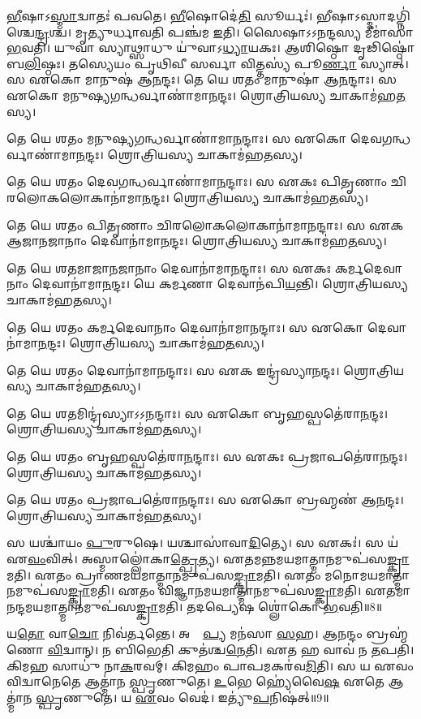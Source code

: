 \ul{𑌭𑍀}𑌷𑌾𑌽\ul{𑌸𑍍𑌮𑌾}𑌦𑍍𑌵𑌾𑌤𑌃॑ 𑌪𑌵𑌤𑍇। 
\ul{𑌭𑍀}𑌷𑍋𑌦𑍇॑\ul{𑌤𑌿} 𑌸𑍂𑌰𑍍𑌯𑌃॑। 
𑌭𑍀𑌷𑌾𑌽𑌸𑍍𑌮𑌾𑌦𑌗𑍍𑌨𑌿॑\-𑌶𑍍𑌚𑍇\ul{𑌨𑍍𑌦𑍍𑌰}𑌶𑍍𑌚। 
𑌮𑍃𑌤𑍍𑌯𑍁𑌰𑍍𑌧𑌾𑌵𑌤𑌿 𑌪𑌞𑍍𑌚॑𑌮 \ul{𑌇}𑌤𑌿। 
𑌸𑍈𑌷𑌾𑌽𑌽𑌨𑌨𑍍𑌦𑌸𑍍𑌯 𑌮𑍀𑌮𑌾॑𑌸𑌾 \ul{𑌭}𑌵𑌤𑌿। 
𑌯𑍁𑌵𑌾 𑌸𑍍𑌯𑌾𑌥𑍍𑌸𑌾𑌧𑍁 𑌯𑍁॑𑌵𑌾𑌽\ul{𑌧𑍍𑌯𑌾}𑌯𑌕𑌃। 
𑌆𑌶𑌿𑌷𑍍𑌠𑍋 𑌦𑍃𑌢𑌿𑌷𑍍𑌠𑍋॑ 𑌬\ul{𑌲𑌿}𑌷𑍍𑌠𑌃। 
𑌤𑌸𑍍𑌯𑍇𑌯𑌂 𑌪𑍃𑌥𑌿𑌵𑍀 𑌸𑌰𑍍𑌵𑌾 𑌵𑌿𑌤𑍍𑌤𑌸𑍍𑌯॑ 𑌪𑍂\ul{𑌰𑍍𑌣𑌾} 𑌸𑍍𑌯𑌾𑌤𑍍। 
𑌸 𑌏𑌕𑍋 𑌮𑌾𑌨𑍁𑌷॑ 𑌆\ul{𑌨}𑌨𑍍𑌦𑌃। 
𑌤𑍇 𑌯𑍇 𑌶𑌤𑌂 𑌮𑌾𑌨𑍁𑌷𑌾॑ 𑌆\ul{𑌨}𑌨𑍍𑌦𑌾𑌃। 
𑌸 𑌏𑌕𑍋 𑌮𑌨𑍁𑌷𑍍𑌯𑌗𑌨𑍍𑌧𑌰𑍍𑌵𑌾𑌣𑌾॑𑌮𑌾\ul{𑌨}𑌨𑍍𑌦𑌃। 
𑌶𑍍𑌰𑍋𑌤𑍍𑌰𑌿𑌯𑌸𑍍𑌯 𑌚𑌾𑌕𑌾𑌮॑𑌹\ul{𑌤}𑌸𑍍𑌯। 

𑌤𑍇 𑌯𑍇 𑌶𑌤𑌂 𑌮𑌨𑍁𑌷𑍍𑌯𑌗𑌨𑍍𑌧𑌰𑍍𑌵𑌾𑌣𑌾॑𑌮𑌾\ul{𑌨}𑌨𑍍𑌦𑌾𑌃। 
𑌸 𑌏𑌕𑍋 𑌦𑍇𑌵𑌗𑌨𑍍𑌧𑌰𑍍𑌵𑌾𑌣𑌾॑𑌮𑌾\ul{𑌨}𑌨𑍍𑌦𑌃। 
𑌶𑍍𑌰𑍋𑌤𑍍𑌰𑌿𑌯𑌸𑍍𑌯 𑌚𑌾𑌕𑌾𑌮॑𑌹\ul{𑌤}𑌸𑍍𑌯। 

𑌤𑍇 𑌯𑍇 𑌶𑌤𑌂 𑌦𑍇𑌵𑌗𑌨𑍍𑌧𑌰𑍍𑌵𑌾𑌣𑌾॑𑌮𑌾\ul{𑌨}𑌨𑍍𑌦𑌾𑌃। 
𑌸 𑌏𑌕𑌃 𑌪𑌿𑌤𑍃𑌣𑌾𑌂 𑌚𑌿𑌰𑌲𑍋𑌕𑌲𑍋𑌕𑌾𑌨𑌾॑𑌮𑌾\ul{𑌨}𑌨𑍍𑌦𑌃। 
𑌶𑍍𑌰𑍋𑌤𑍍𑌰𑌿𑌯𑌸𑍍𑌯 𑌚𑌾𑌕𑌾𑌮॑𑌹\ul{𑌤}𑌸𑍍𑌯। 

𑌤𑍇 𑌯𑍇 𑌶𑌤𑌂 𑌪𑌿𑌤𑍃𑌣𑌾𑌂 𑌚𑌿𑌰𑌲𑍋𑌕𑌲𑍋𑌕𑌾𑌨𑌾॑\-𑌮𑌾\ul{𑌨}𑌨𑍍𑌦𑌾𑌃। 
𑌸 𑌏𑌕 𑌆𑌜𑌾𑌨𑌜𑌾𑌨𑌾𑌂 𑌦𑍇𑌵𑌾𑌨𑌾॑𑌮𑌾\ul{𑌨}𑌨𑍍𑌦𑌃। 
𑌶𑍍𑌰𑍋𑌤𑍍𑌰𑌿𑌯𑌸𑍍𑌯 𑌚𑌾𑌕𑌾𑌮॑𑌹\ul{𑌤}𑌸𑍍𑌯। 

𑌤𑍇 𑌯𑍇 𑌶𑌤𑌮𑌾𑌜𑌾𑌨𑌜𑌾𑌨𑌾𑌂 𑌦𑍇𑌵𑌾𑌨𑌾॑𑌮𑌾\ul{𑌨}𑌨𑍍𑌦𑌾𑌃। 
𑌸 𑌏𑌕𑌃 𑌕𑌰𑍍𑌮𑌦𑍇𑌵𑌾𑌨𑌾𑌂 𑌦𑍇𑌵𑌾𑌨𑌾॑𑌮𑌾\ul{𑌨}𑌨𑍍𑌦𑌃। 
𑌯𑍇 𑌕𑌰𑍍𑌮𑌣𑌾 𑌦𑍇𑌵𑌾𑌨॑𑌪𑌿\ul{𑌯}𑌨𑍍𑌤𑌿। 
𑌶𑍍𑌰𑍋𑌤𑍍𑌰𑌿𑌯𑌸𑍍𑌯 𑌚𑌾𑌕𑌾𑌮॑𑌹\ul{𑌤}𑌸𑍍𑌯। 

𑌤𑍇 𑌯𑍇 𑌶𑌤𑌂 𑌕𑌰𑍍𑌮𑌦𑍇𑌵𑌾𑌨𑌾𑌂 𑌦𑍇𑌵𑌾𑌨𑌾॑𑌮𑌾\ul{𑌨}𑌨𑍍𑌦𑌾𑌃। 
𑌸 𑌏𑌕𑍋 𑌦𑍇𑌵𑌾𑌨𑌾॑𑌮𑌾\ul{𑌨}𑌨𑍍𑌦𑌃। 
𑌶𑍍𑌰𑍋𑌤𑍍𑌰𑌿𑌯𑌸𑍍𑌯 𑌚𑌾𑌕𑌾𑌮॑𑌹\ul{𑌤}𑌸𑍍𑌯। 

𑌤𑍇 𑌯𑍇 𑌶𑌤𑌂 𑌦𑍇𑌵𑌾𑌨𑌾॑𑌮𑌾\ul{𑌨}𑌨𑍍𑌦𑌾𑌃। 
𑌸 𑌏𑌕 𑌇𑌨𑍍𑌦𑍍𑌰॑𑌸𑍍𑌯𑌾\ul{𑌨}𑌨𑍍𑌦𑌃। 
𑌶𑍍𑌰𑍋𑌤𑍍𑌰𑌿𑌯𑌸𑍍𑌯 𑌚𑌾𑌕𑌾𑌮॑𑌹\ul{𑌤}𑌸𑍍𑌯। 

𑌤𑍇 𑌯𑍇 𑌶𑌤𑌮𑌿𑌨𑍍𑌦𑍍𑌰॑𑌸𑍍𑌯𑌾𑌽𑌽\ul{𑌨}𑌨𑍍𑌦𑌾𑌃। 
𑌸 𑌏𑌕𑍋 𑌬𑍃𑌹𑌸𑍍𑌪𑌤𑍇॑𑌰𑌾\ul{𑌨}𑌨𑍍𑌦𑌃। 
𑌶𑍍𑌰𑍋𑌤𑍍𑌰𑌿𑌯𑌸𑍍𑌯 𑌚𑌾𑌕𑌾𑌮॑𑌹\ul{𑌤}𑌸𑍍𑌯। 

𑌤𑍇 𑌯𑍇 𑌶𑌤𑌂 𑌬𑍃𑌹𑌸𑍍𑌪𑌤𑍇॑𑌰𑌾\ul{𑌨}𑌨𑍍𑌦𑌾𑌃। 
𑌸 𑌏𑌕𑌃 𑌪𑍍𑌰𑌜𑌾𑌪𑌤𑍇॑𑌰𑌾\ul{𑌨}𑌨𑍍𑌦𑌃। 
𑌶𑍍𑌰𑍋𑌤𑍍𑌰𑌿𑌯𑌸𑍍𑌯 𑌚𑌾𑌕𑌾𑌮॑𑌹\ul{𑌤}𑌸𑍍𑌯। 

𑌤𑍇 𑌯𑍇 𑌶𑌤𑌂 𑌪𑍍𑌰𑌜𑌾𑌪𑌤𑍇॑𑌰𑌾\ul{𑌨}𑌨𑍍𑌦𑌾𑌃। 
𑌸 𑌏𑌕𑍋 𑌬𑍍𑌰𑌹𑍍𑌮𑌣॑ 𑌆\ul{𑌨}𑌨𑍍𑌦𑌃। 
𑌶𑍍𑌰𑍋𑌤𑍍𑌰𑌿𑌯𑌸𑍍𑌯 𑌚𑌾𑌕𑌾𑌮॑𑌹\ul{𑌤}𑌸𑍍𑌯। 

𑌸 𑌯𑌶𑍍𑌚𑌾॑𑌯𑌂 \ul{𑌪𑍁}𑌰𑍁𑌷𑍇। 
𑌯𑌶𑍍𑌚𑌾𑌸𑌾॑𑌵𑌾\ul{𑌦𑌿}𑌤𑍍𑌯𑍇। 
𑌸 𑌏𑌕𑌃॑। 
𑌸 𑌯॑ 𑌏\ul{𑌵𑌂}𑌵𑌿𑌤𑍍। 
𑌅𑌸𑍍𑌮𑌾𑌲𑍍𑌲𑍋॑𑌕𑌾\ul{𑌤𑍍𑌪𑍍𑌰𑍇}𑌤𑍍𑌯। 
𑌏𑌤𑌮𑌨𑍍𑌨𑌮𑌯𑌮𑌾𑌤𑍍𑌮𑌾𑌨𑌮𑍁𑌪॑𑌸\ul{𑌙𑍍𑌕𑍍𑌰𑌾}𑌮𑌤𑌿। 
𑌏𑌤𑌂 𑌪𑍍𑌰𑌾𑌣𑌮𑌯𑌮𑌾𑌤𑍍𑌮𑌾𑌨𑌮𑍁𑌪॑𑌸\ul{𑌙𑍍𑌕𑍍𑌰𑌾}𑌮𑌤𑌿। 
𑌏𑌤𑌂 𑌮𑌨𑍋𑌮𑌯𑌮𑌾𑌤𑍍𑌮𑌾𑌨𑌮𑍁𑌪॑\-𑌸\ul{𑌙𑍍𑌕𑍍𑌰𑌾}𑌮𑌤𑌿। 
𑌏𑌤𑌂 𑌵𑌿𑌜𑍍𑌞𑌾𑌨𑌮𑌯𑌮𑌾𑌤𑍍𑌮𑌾𑌨𑌮𑍁𑌪॑\-𑌸\ul{𑌙𑍍𑌕𑍍𑌰𑌾}𑌮𑌤𑌿। 
𑌏𑌤𑌮𑌾𑌨𑌨𑍍𑌦\-𑌮𑌯𑌮𑌾𑌤𑍍𑌮𑌾𑌨𑌮𑍁𑌪॑\-𑌸\ul{𑌙𑍍𑌕𑍍𑌰𑌾}𑌮𑌤𑌿। 
𑌤𑌦𑌪𑍍𑌯𑍇𑌷 𑌶𑍍𑌲𑍋॑𑌕𑍋 \ul{𑌭}𑌵𑌤𑌿॥8॥

𑌯\ul{𑌤𑍋} 𑌵𑌾\ul{𑌚𑍋} 𑌨𑌿𑌵॑𑌰𑍍𑌤𑌨𑍍𑌤𑍇। 
𑌅𑌪𑍍𑌰𑌾᳚\ul{𑌪𑍍𑌯} 𑌮𑌨॑𑌸𑌾 \ul{𑌸}𑌹। 
𑌆𑌨𑌨𑍍𑌦𑌂 𑌬𑍍𑌰𑌹𑍍𑌮॑𑌣𑍋 \ul{𑌵𑌿}𑌦𑍍𑌵𑌾𑌨𑍍। 
𑌨 𑌬𑌿𑌭𑍇𑌤𑌿 𑌕𑍁𑌤॑𑌶𑍍𑌚\ul{𑌨𑍇}𑌤𑌿। 
𑌏𑌤 𑌹 𑌵𑌾𑌵॑ 𑌨 \ul{𑌤}𑌪𑌤𑌿। 
𑌕𑌿𑌮𑌹 𑌸𑌾𑌧𑍁॑ 𑌨𑌾\ul{𑌕}𑌰𑌵𑌮𑍍। 
𑌕𑌿𑌮𑌹𑌂 𑌪𑌾𑌪𑌮𑌕𑌰॑𑌵\ul{𑌮𑌿}𑌤𑌿। 
𑌸 𑌯 𑌏𑌵𑌂 𑌵𑌿𑌦𑍍𑌵𑌾𑌨𑍇𑌤𑍇 𑌆𑌤𑍍𑌮𑌾॑𑌨 \ul{𑌸𑍍𑌪𑍃}𑌣𑍁𑌤𑍇। 
\ul{𑌉}𑌭𑍇 𑌹𑍍𑌯𑍇॑𑌵𑍈\ul{𑌷} 𑌏𑌤𑍇 𑌆𑌤𑍍𑌮𑌾॑𑌨 \ul{𑌸𑍍𑌪𑍃}𑌣𑍁𑌤𑍇। 
𑌯 \ul{𑌏}𑌵𑌂 𑌵𑍇𑌦॑। 
𑌇𑌤𑍍𑌯𑍁॑\ul{𑌪}𑌨𑌿𑌷॑𑌤𑍍॥9॥


